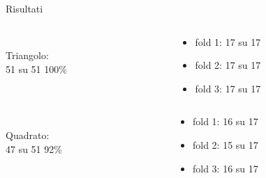 \documentclass[hyperref={pdfpagelabels=false},slidestop,mathserif,red]{beamer}
\begin{document}
\begin{frame}[shrink]{Risultati}
\begin{block}{}
\begin{columns}[T]
\begin{column}[C]{2cm}
\ \\
\alert{Triangolo:}\\
51 su 51 100\%
\end{column}
\begin{column}[TL]{8cm}
\begin{itemize}
 \item fold 1: 17 su 17
 \item fold 2: 17 su 17
 \item fold 3: 17 su 17
\end{itemize}
\end{column}
\end{columns}
\end{block}

\begin{block}{}
\begin{columns}[T]
\begin{column}[C]{2cm}
\ \\
\alert{Quadrato:}\\
47 su 51 92\%
\end{column}
\begin{column}[TL]{8cm}
\begin{itemize}
 \item fold 1: 16 su 17
 \item fold 2: 15 su 17
 \item fold 3: 16 su 17
\end{itemize}
\end{column}
\end{columns}
\end{block}


\end{frame}
\end{document}
